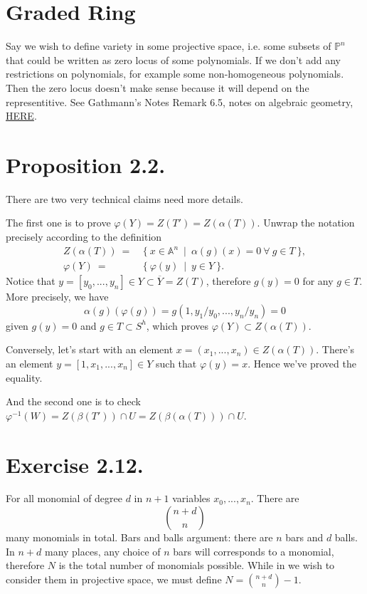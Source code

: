 \section{Graded Ring}

Say we wish to define variety in some projective space, i.e. some subsets of $\mathbb P^n$ that could be written as zero locus of some polynomials.
If we don't add any restrictions on polynomials, for example some non-homogeneous polynomials. 
Then the zero locus doesn't make sense because it will depend on the representitive. See Gathmann's Notes Remark 6.5, notes on algebraic geometry, \href{https://agag-gathmann.math.rptu.de/class/alggeom-2021/alggeom-2021-c6.pdf}{HERE}.

\section{Proposition 2.2.}

There are two very technical claims need more details. 

The first one is to prove $\varphi(Y)=Z(T')=Z(\alpha (T)).$
Unwrap the notation precisely according to the definition \begin{align*}
    Z(\alpha (T)) ~=&~ \{~ x\in \mathbb A^n ~\mid~ \alpha(g)(x)=0 ~\forall~ g\in T ~\},\\
    \varphi(Y) ~=&~ \{~ \varphi(y) ~\mid~ y\in Y ~\}.
\end{align*}
Notice that $y=[y_0,...,y_n]\in Y\subset \overline{Y}=Z(T)$, therefore $g(y)=0$ for any $g\in T$.
More precisely, we have 
\[\alpha(g)(\varphi(g))=g(1,y_1/y_0,...,y_n/y_n)=0\] given $g(y)=0$ and $g\in T\subset S^h$, which proves $\varphi(Y)\subset Z(\alpha (T))$.

Conversely, let's start with an element $x=(x_1,...,x_n)\in Z(\alpha (T))$. There's an element $y=[1,x_1,...,x_n]\in Y$ such that $\varphi(y)=x$. Hence we've proved the equality.

And the second one is to check $\varphi^{-1}(W)=Z(\beta(T'))\cap U=Z(\beta(\alpha(T)))\cap U$.


\section{Exercise 2.12.}

For all monomial of degree $d$ in $n+1$ variables $x_0,...,x_n$. 
There are \[\binom{n+d}{n}\] many monomials in total. Bars and balls argument: there are $n$ bars and $d$ balls. In $n+d$ many places, any choice of $n$ bars will corresponds to a monomial, therefore $N$ is the total number of monomials possible. While in we wish to consider them in projective space, we must define $N=\binom{n+d}{n}-1$.

